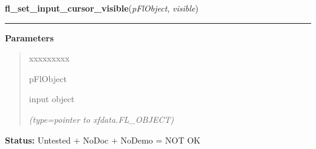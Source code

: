 \hspace{.8\funcindent}\begin{boxedminipage}{\funcwidth}

    \raggedright \textbf{fl\_set\_input\_cursor\_visible}(\textit{pFlObject}, \textit{visible})

    \vspace{-1.5ex}

    \rule{\textwidth}{0.5\fboxrule}
\setlength{\parskip}{2ex}
\setlength{\parskip}{1ex}
      \textbf{Parameters}
      \vspace{-1ex}

      \begin{quote}
        \begin{Ventry}{xxxxxxxxx}

          \item[pFlObject]

          input object

            {\it (type=pointer to xfdata.FL\_OBJECT)}

        \end{Ventry}

      \end{quote}

\textbf{Status:} Untested + NoDoc + NoDemo = NOT OK



    \end{boxedminipage}

    \label{xformslib:flinput:fl_get_input_numberoflines}

    \vspace{0.5ex}


